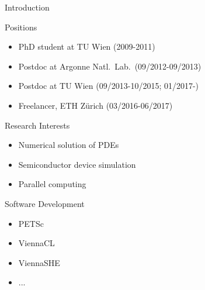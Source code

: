 



% 
% 


\begin{frame}{Introduction}

 \begin{minipage}{0.68\textwidth}
 \begin{block}{Positions}
   \begin{itemize}
    \item PhD student at TU Wien (2009-2011)
    \item Postdoc at Argonne Natl.~Lab.~(09/2012-09/2013)
    \item Postdoc at TU Wien (09/2013-10/2015; 01/2017-)
    \item Freelancer, ETH Z\"urich (03/2016-06/2017)
   \end{itemize}
 \end{block}

 \begin{block}{Research Interests}
   \begin{itemize}
    \item Numerical solution of PDEs
    \item Semiconductor device simulation
    \item Parallel computing
   \end{itemize}
 \end{block}

 \begin{block}{Software Development}
   \begin{itemize}
    \item PETSc
    \item ViennaCL
    \item ViennaSHE
    \item ...
   \end{itemize}
 \end{block}
 \end{minipage}
  \begin{minipage}{0.3\textwidth}
 \end{minipage}

\end{frame}
